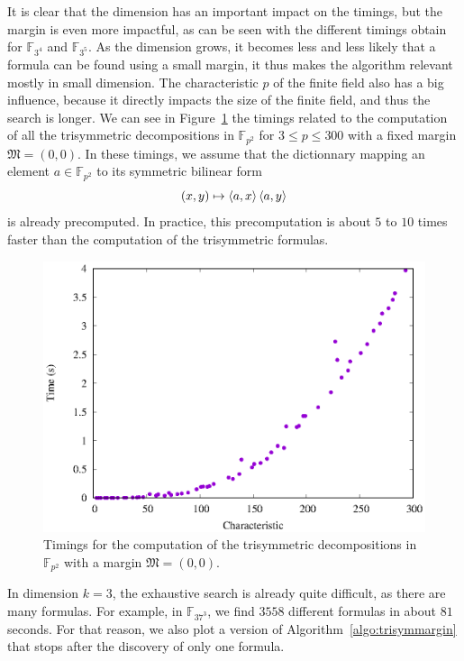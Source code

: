 It is clear that the dimension has an important impact on the timings, but the
margin is even more impactful, as can be seen with the different timings obtain
for $\mathbb{F}_{3^4}$ and $\mathbb{F}_{3^5}$. As the dimension grows, it
becomes less and less likely that a formula can be found using a small margin,
it thus makes the algorithm relevant mostly in small dimension. The
characteristic $p$ of the finite field also has a big influence, because it
directly impacts the size of the finite field, and thus the search is longer. We
can see in Figure~\ref{fig:fixed-margin-0-0} the timings related to the
computation of all the trisymmetric decompositions in $\mathbb{F}_{p^2}$ for
$3\leq p\leq 300$ with a fixed margin $\mathfrak M =(0,0)$. In these timings, we
assume that the dictionnary mapping an element $a\in\mathbb{F}_{p^2}$ to its
symmetric bilinear form
\[
  (x,y)\mapsto\left\langle a,x\right\rangle\left\langle a,y\right\rangle
\]
is already precomputed. In practice, this precomputation is about $5$ to $10$
times faster than the computation of the trisymmetric formulas.
\begin{figure}
  \centering
  \includegraphics{benchmarks/hypersymmetric/fixed-margin-0-0.eps}
  \caption{Timings for the computation of the trisymmetric decompositions in
    $\mathbb{F}_{p^2}$ with a margin $\mathfrak M=(0,0)$.}
  \label{fig:fixed-margin-0-0}
\end{figure}
In dimension $k=3$, the exhaustive search is already quite difficult, as there
are many formulas. For example, in $\mathbb{F}_{37^3}$, we find $3558$ different
formulas in about $81$ seconds. For that reason, we also plot a version of
Algorithm~\ref{algo:trisymmargin} that stops after the discovery of only one formula.

